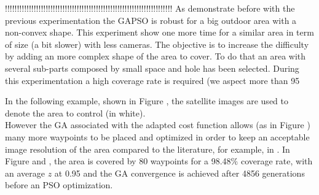 

  
 
!!!!!!!!!!!!!!!!!!!!!!!!!!!!!!!!!!!!!!!!!!!!!!!!!!!!!!!!!!!!!!!!!!!!!!
As demonstrate before with the previous experimentation the GAPSO is robust for a big outdoor area with a non-convex shape. This experiment show one more time for a similar area in term of size (a bit slower) with  less cameras. The objective is to increase the difficulty  by adding  an more complex shape of the area to cover. To do that an area with several sub-parts composed by small space and hole has been selected.
During this experimentation a high coverage rate is required (we aspect more than 95%

In the following example, shown in Figure , the satellite images are used to denote the area to control (in white). \\

 However the GA associated with the adapted cost function allows  (as in Figure ) many more waypoints to be placed and optimized in order to keep an acceptable image resolution of the area compared to the literature, for example, in \cite{8*,33*}. In Figure  and , the area is covered by 80 waypoints for a 98.48$\%$ coverage rate, with an average $z$ at 0.95 and  the GA convergence is achieved after 4856 generations before an PSO optimization. \\
		



 


